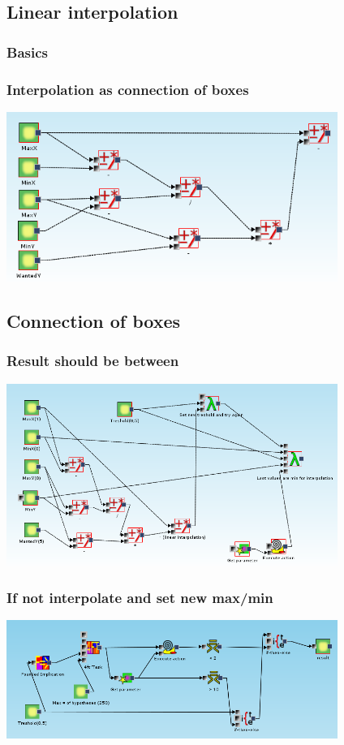 \documentclass{beamer}
\begin{document}
\subsection{Linear interpolation}
\begin{frame}
	\frametitle{Basics}
\end{frame}

\begin{frame}
	\frametitle{Interpolation as connection of boxes}
	\includegraphics[width=10.8cm]{linearInterpolation}
\end{frame}

\subsection{Connection of boxes}
\begin{frame}
	\frametitle{Result should be between}
	\includegraphics[width=10.8cm]{exampleMainRecursionPart}
\end{frame}

\begin{frame}
	\frametitle{If not interpolate and set new max/min}
	\includegraphics[width=10.8cm]{exampleMainMiningPart}
\end{frame}
\end{document}
